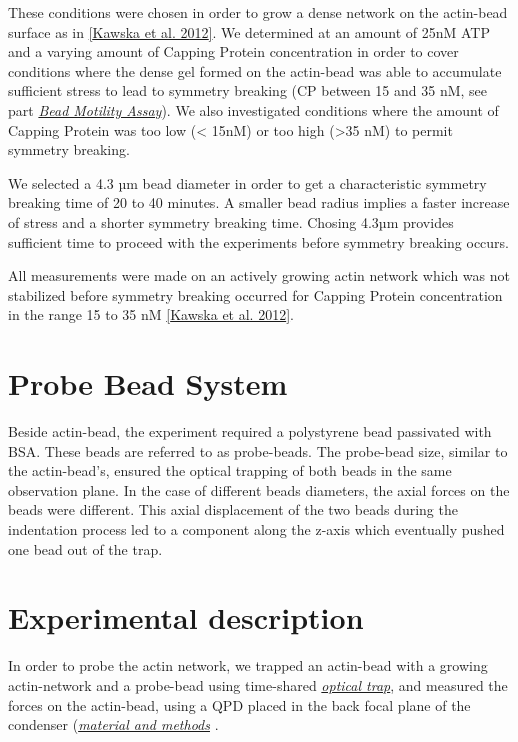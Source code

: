 \documentclass[A4paperpaper,11pt,english]{sphinxmanual}
\begin{document}
These conditions were chosen in order to grow a dense network on the actin-bead surface as in {\hyperref[index-latex:kawska2012]{{[}Kawska et al. 2012{]}}}. We determined at an amount of 25nM ATP and a varying
amount of Capping Protein concentration in order to cover conditions where the
dense gel formed on the actin-bead was able to accumulate sufficient stress
to lead to symmetry breaking (CP between 15  and 35 nM, see part {\hyperref[index-latex:bead-motility-assay]{\emph{Bead Motility Assay}}}). We also investigated
conditions where the amount of Capping Protein was too low (\textless{} 15nM) or too high
(\textgreater{}35 nM) to permit symmetry breaking.

We selected a 4.3 µm bead diameter in order to get a characteristic symmetry
breaking time of 20 to 40 minutes.
A smaller bead radius implies a
faster increase of stress and a shorter symmetry breaking time.
Chosing 4.3µm provides sufficient time to proceed with the
experiments before symmetry breaking occurs.

All measurements were made on an actively growing actin network which
was not stabilized before symmetry breaking
occurred for Capping Protein concentration in the range 15 to 35 nM {\hyperref[index-latex:kawska2012]{{[}Kawska et al. 2012{]}}}.


\section{Probe Bead System}
\label{index-latex:probe-bead-system}
Beside actin-bead, the experiment required a polystyrene bead passivated
with BSA. These beads are referred to as probe-beads.  The probe-bead size, similar to the actin-bead’s, ensured the optical
trapping of both beads in the same observation plane. In the case of different beads diameters, the axial forces on the beads were different. This axial
displacement of the two beads during the indentation process led to a
component along the z-axis which  eventually pushed one bead out of the trap.


\section{Experimental description}
\label{index-latex:experimental-description}
In order to probe the actin network, we trapped an actin-bead with a growing actin-network
and a probe-bead using time-shared {\hyperref[index-latex:time-shared-ot]{\emph{optical trap}}},  and
measured the forces on the actin-bead, using a QPD placed in the back focal plane of
the condenser ({\hyperref[index-latex:m-et-m]{\emph{material and methods}}} .
\end{document}
